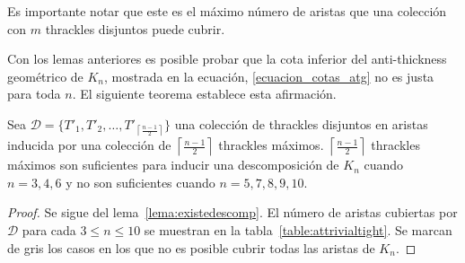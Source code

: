   Es importante notar que este es el máximo número de aristas que una colección
  con $m$ thrackles disjuntos puede cubrir.

  Con los lemas anteriores es posible probar que la cota inferior del
  anti-thickness geométrico de $K_n$, mostrada en la ecuación,
  \ref{ecuacion_cotas_atg} no es justa para toda $n$. El siguiente teorema
  establece esta afirmación.
  \begin{theorem}\label{teo:cotainf}
  Sea $\mathcal{D}=\{T'_1,T'_2,\dots,T'_{\left\lceil\frac{n-1}{2}\right\rceil}\}$
  una colección de thrackles disjuntos en aristas inducida por una colección de
  $\left\lceil\frac{n-1}{2}\right\rceil$ thrackles máximos.
  $\left\lceil\frac{n-1}{2}\right\rceil$ thrackles máximos son
  suficientes para inducir una descomposición de $K_n$ cuando $n={3,4,6}$ y no son suficientes cuando $n={5,7,8,9,10}$.
  \end{theorem}
  \begin{proof}
    Se sigue del lema~\ref{lema:existedescomp}. El número de aristas cubiertas
    por $\mathcal{D}$ para cada $3\leq n \leq 10$ se muestran en la
    tabla~\ref{table:attrivialtight}. Se marcan de gris los casos en los que no es
    posible cubrir todas las aristas de $K_n$.
  \end{proof}


